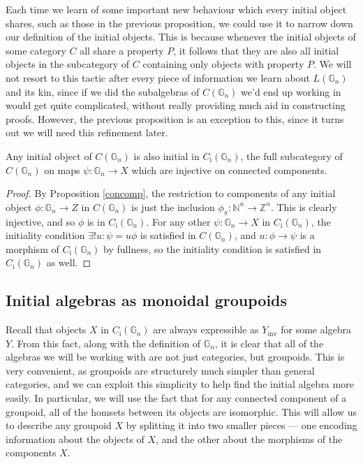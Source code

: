 \documentclass{amsart} %
\begin{document}
Each time we learn of some important new behaviour which every initial object shares, such as those in the previous proposition, we could use it to narrow down our definition of the initial objects. This is because whenever the initial objects of some category $C$ all share a property $P$, it follows that they are also all initial objects in the subcategory of $C$ containing only objects with property $P$. We will not resort to this tactic after every piece of information we learn about $L(\mathbb{G}_n)$ and its kin, since if we did the subalgebras of $C(\mathbb{G}_n)$ we'd end up working in would get quite complicated, without really providing much aid in constructing proofs. However, the previous proposition is an exception to this, since it turns out we will need this refinement later.

\begin{cor} Any initial object of $C(\mathbb{G}_n)$ is also initial in $C_{\mathrm{i}}(\mathbb{G}_n)$, the full subcategory of $C(\mathbb{G}_n)$ on maps $\psi: \mathbb{G}_n \to X$ which are injective on connected components. 
\end{cor}
\begin{proof}
By Proposition \ref{concomp}, the restriction to components of any initial object $\phi: \mathbb{G}_n \to Z$ in $C(\mathbb{G}_n)$ is just the inclusion $\phi_\pi : \mathbb{N}^n \to \mathbb{Z}^n$. This is clearly injective, and so $\phi$ is in $C_{\mathrm{i}}(\mathbb{G}_n)$. For any other $\psi: \mathbb{G}_n \to X$ in $C_{\mathrm{i}}(\mathbb{G}_n)$, the initiality condition $\exists ! u : \psi = u \phi$ is satisfied in $C(\mathbb{G}_n)$, and $u: \phi \to \psi$ is a morphism of $C_{\mathrm{i}}(\mathbb{G}_n)$ by fullness, so the initiality condition is satisfied in $C_{\mathrm{i}}(\mathbb{G}_n)$ as well.
\end{proof}

\subsection{Initial algebras as monoidal groupoids}

Recall that objects $X$ in $C_{\mathrm{i}}(\mathbb{G}_n)$ are always expressible as $Y_{\mathrm{inv}}$ for some algebra $Y$. From this fact, along with the definition of $\mathbb{G}_n$, it is clear that all of the algebras we will be working with are not just categories, but groupoids. This is very convenient, as groupoids are structurely much simpler than general categories, and we can exploit this simplicity to help find the initial algebra more easily. In particular, we will use the fact that for any connected component of a groupoid, all of the homsets between its objects are isomorphic. This will allow us to describe any groupoid $X$ by splitting it into two smaller pieces --- one encoding information about the objects of $X$, and the other about the morphisms of the components $X$. 
\end{document}
